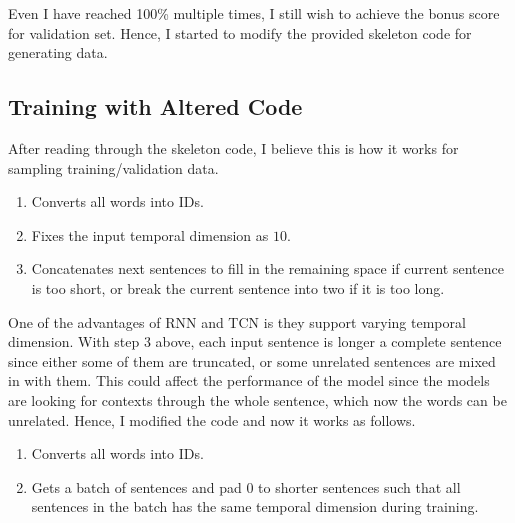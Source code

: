 \documentclass[12pt]{article}
\begin{document}
Even I have reached 100\% multiple times, I still wish to achieve the bonus score for validation set. Hence, I started to modify the provided skeleton code for generating data.

\subsection{Training with Altered Code}
After reading through the skeleton code, I believe this is how it works for sampling training/validation data.
\begin{enumerate}
	\item Converts all words into IDs.
	\item Fixes the input temporal dimension as \(10\).
	\item Concatenates next sentences to fill in the remaining space if current sentence is too short, or break the current sentence into two if it is too long.
\end{enumerate}

One of the advantages of RNN and TCN is they support varying temporal dimension. With step 3 above, each input sentence is longer a complete sentence since either some of them are truncated, or some unrelated sentences are mixed in with them. This could affect the performance of the model since the models are looking for contexts through the whole sentence, which now the words can be unrelated. Hence, I modified the code and now it works as follows.
\begin{enumerate}
	\item Converts all words into IDs.
	\item Gets a batch of sentences and pad \(0\) to shorter sentences such that all sentences in the batch has the same temporal dimension during training.
\end{enumerate}
\end{document}
